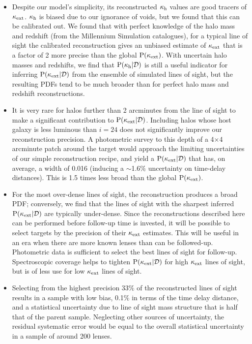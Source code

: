 \documentclass[useAMS,usenatbib]{mn2e}
\begin{document}
\begin{itemize} 

\item Despite our model's simplicity, its reconstructed $\kappa_{\rm h}$ values are
good tracers of $\kappa_{\rm ext}$. $\kappa_{\rm h}$ is biased due to our ignorance of voids, but we found that this can be calibrated out. We found that with perfect knowledge of
the halo mass and redshift (from the Millennium Simulation catalogues), for a
typical line of sight the calibrated reconstruction gives an unbiased estimate
of $\kappa_{\rm ext}$ that is a factor of 2 more precise than the global ${\rm P}(\kappa_{\rm ext})$.
With uncertain halo masses and redshifts, we find that
${\rm P}(\kappa_{\rm h}|{\mathcal{D}})$ is still a useful indicator for inferring
${\rm P}(\kappa_{\rm ext}|{\mathcal{D}})$ from the ensemble of simulated lines of sight, but the
resulting PDFs tend to be much broader than for perfect halo mass and redshift
reconstructions.

\item It is very rare for halos further than 2 arcminutes from the line of
sight to make a significant contribution to ${\rm P}(\kappa_{\rm ext}|{\mathcal{D}})$. Including
halos whose host galaxy is less luminous than $i=24$ does not significantly
improve our reconstruction precision.  A photometric survey to this depth of a
4$\times$4 arcminute patch around the target would approach the limiting
uncertainties of our simple reconstruction recipe, and yield a 
${\rm P}(\kappa_{\rm ext}|{\mathcal{D}})$ that has, on average, a width of 0.016 (inducing a $\sim$1.6\%
uncertainty on time-delay distances). This is 1.5 times
less broad than the global ${\rm P}(\kappa_{\rm ext})$. 

\item  For the most over-dense lines of sight, the reconstruction produces a
broad PDF; conversely, we find that the lines of sight with the sharpest
inferred ${\rm P}(\kappa_{\rm ext}|{\mathcal{D}})$ are typically under-dense. Since the
reconstructions described here can be performed before follow-up time is
invested, it will be possible to select targets by the precision of their
$\kappa_{\rm ext}$ estimates. This will be useful
in an era when there are more known lenses than can be followed-up.
Photometric data is sufficient to select the best lines of sight for
follow-up. Spectroscopic coverage helps to tighten  ${\rm P}(\kappa_{\rm ext}|{\mathcal{D}})$ for
high $\kappa_{\rm ext}$ lines of sight, but is of less use for low $\kappa_{\rm ext}$ lines of
sight.

\item Selecting from the highest precision 33\% of the reconstructed lines of sight
results in a sample with low bias, 0.1\% in terms of the time delay distance,
and a statistical uncertainty due to line of sight mass structure that is half
that of the parent sample. Neglecting other sources of uncertainty, the residual systematic error would be equal to the
overall statistical uncertainty in a sample of around 200 lenses.


\end{itemize}
\end{document}
